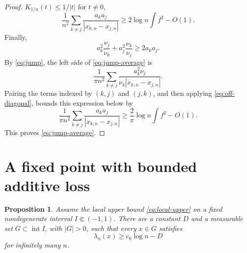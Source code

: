 \documentclass[11pt]{article}
\newtheorem{proposition}[theorem]{Proposition}
\numberwithin{equation}{section}
\begin{document}
\begin{proof}
\(K_{1/n}(t)\le1/|t|\) for \(t\ne0\),
\begin{equation}\label{eq:off-diagonal}
 \frac1{n^2}\sum_{k\ne j}\frac{a_ka_j}{|x_{k,n}-x_{j,n}|}
 \ge2\log n\int f^2-O(1).
\end{equation}
Finally,
\[
 a_k^2\frac{\nu_j}{\nu_k}+a_j^2\frac{\nu_k}{\nu_j}
 \ge2a_ka_j.
\]
By \eqref{eq:jump}, the left side of \eqref{eq:jump-average} is
\[
 \frac1{\pi n^2}\sum_{k\ne j}
       \frac{a_k^2\nu_j}{\nu_k|x_{k,n}-x_{j,n}|}.
\]
Pairing the terms indexed by \((k,j)\) and \((j,k)\), and then applying
\eqref{eq:off-diagonal}, bounds this expression below by
\[
 \frac1{\pi n^2}\sum_{k\ne j}
       \frac{a_ka_j}{|x_{k,n}-x_{j,n}|}
 \ge\frac2\pi\log n\int f^2-O(1).
\]
This proves \eqref{eq:jump-average}.
\end{proof}

\section{A fixed point with bounded additive loss}\label{sec:fixed}

\begin{proposition}\label{prop:recurrence}
Assume the local upper bound \eqref{eq:local-upper} on a fixed
nondegenerate interval \(I\Subset(-1,1)\). There are a constant \(D\)
and a measurable set \(G\subset\operatorname{int}I\), with \(|G|>0\),
such that every \(x\in G\) satisfies
\[
 \lambda_n(x)\ge c_0\log n-D
\]
for infinitely many \(n\).
\end{proposition}
\end{document}
